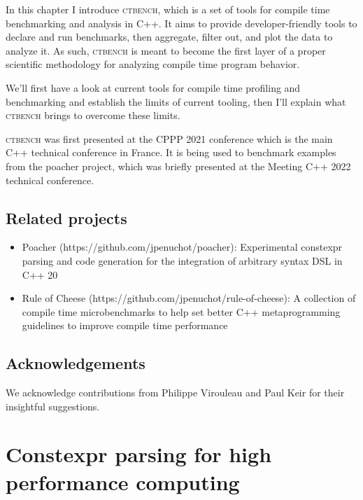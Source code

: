 \documentclass[english,12pt,a4paper]{book}
\providecommand{\cpp}{\textsc{C++}\xspace}
\providecommand{\ctbench}{\textsc{ctbench}\xspace}
\begin{document}
In this chapter I introduce \ctbench, which is a set of tools for compile time
benchmarking and analysis in \cpp. It aims to provide developer-friendly tools
to declare and run benchmarks, then aggregate, filter out, and plot the data to
analyze it. As such, \ctbench is meant to become the first layer of a proper
scientific methodology for analyzing compile time program behavior.

We'll first have a look at current tools for compile time profiling and
benchmarking and establish the limits of current tooling, then I'll explain
what \ctbench brings to overcome these limits.

\ctbench was first presented at the CPPP 2021 conference\cite{ctbench-cppp21}
which is the main \cpp technical conference in France. It is being used to
benchmark examples from the poacher\cite{poacher} project, which was briefly
presented at the Meeting \cpp 2022\cite{meetingcpp22} technical conference.


% 



\section{Related projects} %

\begin{itemize}

\item Poacher (https://github.com/jpenuchot/poacher): Experimental constexpr
      parsing and code generation for the integration of arbitrary syntax DSL in
      \cpp20

\item Rule of Cheese (https://github.com/jpenuchot/rule-of-cheese):
      A collection of compile time microbenchmarks to help set better
      \cpp metaprogramming guidelines to improve compile time performance
\end{itemize}

\section{Acknowledgements}

We acknowledge contributions from Philippe Virouleau and Paul Keir for their
insightful suggestions.

\chapter{
  Constexpr parsing for high performance computing
}
\end{document}
